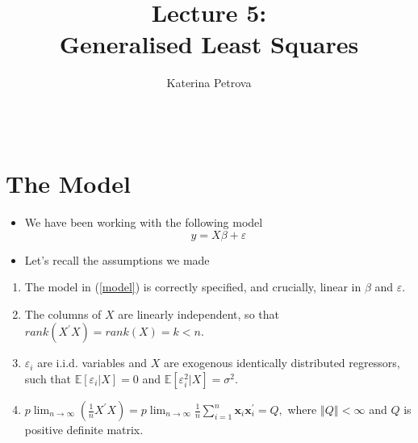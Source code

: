 \documentclass[notes=show]{beamer}
\begin{document}
\title{Lecture 5: \\
Generalised Least Squares}
\author{Katerina Petrova \ \ \ \ \ \ \ \ \ \ \ \ \ \ \ \ \ \ \ \ \ \ \ \ \ \
\ \ \ \ \ \ \ \ \ \ \ \ \ \ \ \ \ \ \ \ \ \ \ \ \ \ \ \ \ \ \ \ \ \ \ \ \ \
\ \ \ \ \ \ \ \ \ \ \ \ \ \ \ \ \ \ \ \ \ \ \ }
\date{}
\maketitle

\section{The Model}

\begin{frame}%


\begin{itemize}
\item We have been working with the following model 
\begin{equation}
y=X\beta +\varepsilon  \label{model}
\end{equation}

\item Let's recall the assumptions we made
\end{itemize}

\begin{enumerate}
\item The model in (\ref{model}) is correctly specified, and crucially,
linear in $\beta $ and $\varepsilon .$

\item The columns of $X$ are linearly independent, so that $rank(X^{\prime
}X)=rank(X)=k<n.$

\item $\varepsilon _{i}$ are i.i.d. variables and $X$ are exogenous
identically distributed regressors, such that $\mathbb{E}[\varepsilon
_{i}|X]=0$ and $\mathbb{E}[\varepsilon _{i}^{2}|X]=\sigma ^{2}.$

\item $p\lim_{n\rightarrow \infty }(\frac{1}{n}X^{\prime
}X)=p\lim_{n\rightarrow \infty }\frac{1}{n}\sum_{i=1}^{n}\mathbf{x}_{i}%
\mathbf{x}_{i}^{\prime }=Q,$ where $\left\Vert Q\right\Vert <\infty $ and $Q$
is positive definite matrix.
\end{enumerate}

\end{frame}%
\end{document}
